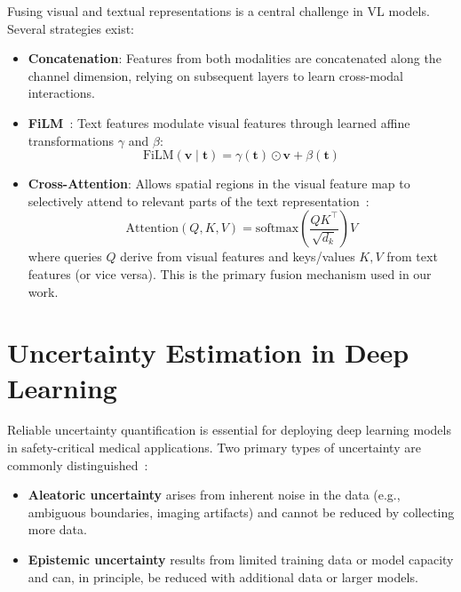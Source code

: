 Fusing visual and textual representations is a central challenge in \ac{VL} models. Several strategies exist:

\begin{itemize}
	\item \textbf{Concatenation}: Features from both modalities are concatenated along the channel dimension, relying on subsequent layers to learn cross-modal interactions.
	
	\item \textbf{\ac{FiLM}}~\cite{perez2018film}: Text features modulate visual features through learned affine transformations $\gamma$ and $\beta$:
	\begin{equation}
		\text{FiLM}(\mathbf{v} \mid \mathbf{t}) = \gamma(\mathbf{t}) \odot \mathbf{v} + \beta(\mathbf{t})
	\end{equation}
	
	\item \textbf{Cross-Attention}: Allows spatial regions in the visual feature map to selectively attend to relevant parts of the text representation~\cite{vaswani2017attention}:
	\begin{equation}
		\text{Attention}(Q, K, V) = \text{softmax}\left(\frac{QK^\top}{\sqrt{d_k}}\right) V
	\end{equation}
	where queries $Q$ derive from visual features and keys/values $K, V$ from text features (or vice versa). This is the primary fusion mechanism used in our work.
\end{itemize}


\section{Uncertainty Estimation in Deep Learning}
\label{sec:bg:uncertainty}

Reliable uncertainty quantification is essential for deploying deep learning models in safety-critical medical applications. Two primary types of uncertainty are commonly distinguished~\cite{kendall2017uncertainties}:

\begin{itemize}
	\item \textbf{Aleatoric uncertainty} arises from inherent noise in the data (e.g., ambiguous boundaries, imaging artifacts) and cannot be reduced by collecting more data.
	\item \textbf{Epistemic uncertainty} results from limited training data or model capacity and can, in principle, be reduced with additional data or larger models.
\end{itemize}

